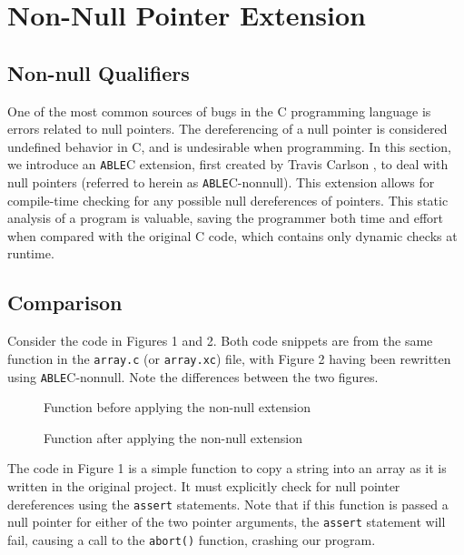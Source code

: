 \documentclass[main.tex]{subfiles}
\begin{document}
\section{Non-Null Pointer Extension}

\subsection{Non-null Qualifiers}
One of the most common sources of bugs in the C programming language is errors
related to null pointers. The dereferencing of a null pointer is considered
undefined behavior in C, and is undesirable when programming. In this section, we introduce an \verb|ABLE|C extension,
first created by Travis Carlson \cite{8}, to
deal with null pointers (referred to herein as \verb|ABLE|C-nonnull). This extension allows for compile-time
checking for any possible null dereferences of pointers. This static analysis of a program is valuable, saving
the programmer both time and effort when compared with the original C code, which contains only dynamic checks
at runtime. 

\subsection{Comparison}

Consider the code in Figures 1 and 2. Both code snippets are from the same function in the \verb|array.c| (or \verb|array.xc|) file,
with Figure 2 having been rewritten using \verb|ABLE|C-nonnull. Note the differences between the two figures.

\begin{figure}[h]

\caption{Function before applying the non-null extension}
\end{figure}
\begin{figure}[h]

\caption{Function after applying the non-null extension}
\end{figure}

The code in Figure 1 is a simple function to copy a string into an array as it is written in the original project. It must explicitly
check for null pointer dereferences using the \verb|assert| statements. Note that if this function is passed a null pointer for either
of the two pointer arguments, the \verb|assert| statement will fail, causing a call to the \verb|abort()| function, crashing our
program.
\end{document}
